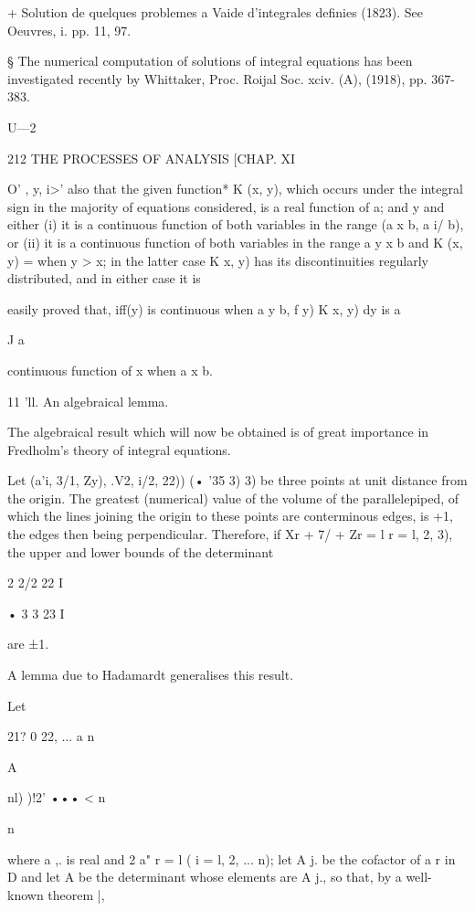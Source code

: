 + Solution de quelques problemes a Vaide d'integrales definies (1823).
See Oeuvres, i. pp. 11, 97.

§ The numerical computation of solutions of integral equations has
been investigated recently by Whittaker, Proc. Roijal Soc. xciv. (A),
(1918), pp. 367-383.

U—2



212 THE PROCESSES OF ANALYSIS [CHAP. XI

O' , y, i>' also that the given function* K (x, y), which occurs under
the integral sign in the majority of equations considered, is a real
function of a; and y and either (i) it is a continuous function of
both variables in the range (a x b, a i/ b), or (ii) it is a
continuous function of both variables in the range a y x b and K (x,
y) = when y > x; in the latter case K x, y) has its discontinuities
regularly distributed, and in either case it is

easily proved that, iff(y) is continuous when a y b, f y) K x, y) dy
is a

J a

continuous function of x when a x b.

11 'll. An algebraical lemma.

The algebraical result which will now be obtained is of great
importance in Fredholm's theory of integral equations.

Let (a'i, 3/1, Zy), .V2, i/2, 22)) (• '35 3) 3) be three points at
unit distance from the origin. The greatest (numerical) value of the
volume of the parallelepiped, of which the lines joining the origin to
these points are conterminous edges, is +1, the edges then being
perpendicular. Therefore, if Xr + 7/ + Zr = l r = l, 2, 3), the upper
and lower bounds of the determinant

 2 2/2 22 I

• 3 3 23 I

are ±1.

A lemma due to Hadamardt generalises this result.



Let



 21? 0 22, ... a n



A



 nl) )!2' ••• < n

n

where a ,. is real and 2 a" r = l ( i = l, 2, ... n); let A j. be the
cofactor of a r in D and let A be the determinant whose elements are A
j., so that, by a well-known theorem |,

